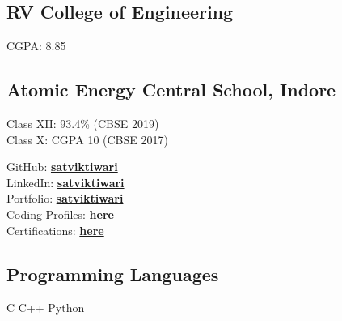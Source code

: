 \documentclass[a4paper]{MagicalCV}
\begin{document}
\lastupdated


\begin{minipage}[t]{0.33\textwidth} 


\subsection{RV College of Engineering}
\vspace{\topsep} %
CGPA: 8.85
\sectionsep

\subsection{Atomic Energy Central School, Indore}
Class XII: 93.4\% (CBSE 2019)\\
Class X: CGPA 10 (CBSE 2017)
\sectionsep


GitHub: \href{https://github.com/satviktiwari}{\bf satviktiwari} \\
LinkedIn: \href{https://www.linkedin.com/in/satviktiwari/}{\bf satviktiwari} \\
Portfolio: \href{https://satviktiwari.netlify.app/}{\bf satviktiwari} \\
Coding Profiles: \href{https://docs.google.com/document/d/1w6rH-2rIib-OvnE8KS2qha2VeT3b99C3/edit?usp=sharing&ouid=109461083264354671311&rtpof=true&sd=true}{\bf here} \\
Certifications: \href{https://docs.google.com/document/d/19C62fVOak_8UI2YRLLVLrC4yf_gmog9Q/edit?usp=sharing&ouid=109461083264354671311&rtpof=true&sd=true}{\bf here} 
\sectionsep


\subsection{Programming Languages}
C \textbullet{}  C++ \textbullet{}  Python
\sectionsep

\end{minipage}
\end{document}
